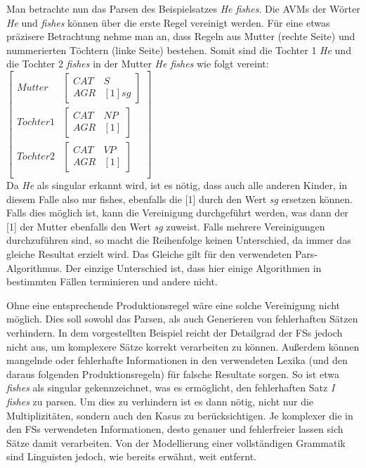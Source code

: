 \documentclass[12pt]{report}
\begin{document}
Man betrachte nun das Parsen des Beispielsatzes \textit{\glqq  He fishes\grqq{}}. Die AVMs der Wörter \textit{He} und \textit{fishes} können über die erste Regel vereinigt werden. Für eine etwas präzisere Betrachtung nehme man an, dass Regeln aus Mutter (rechte Seite) und nummerierten Töchtern (linke Seite) bestehen. Somit sind die Tochter 1 \textit{He} und die Tochter 2 \textit{fishes} in der Mutter \textit{He fishes} wie folgt vereint:\\

$\begin{bmatrix} 
Mutter & \begin{bmatrix} 
CAT & S \\
AGR & [1] sg
\end{bmatrix} \\
Tochter 1 & \begin{bmatrix} 
CAT & NP \\
AGR & [1]
\end{bmatrix} \\
Tochter 2 & \begin{bmatrix} 
CAT & VP \\
AGR & [1]
\end{bmatrix}\\
\end{bmatrix}$\\

Da \textit{\glqq  He\grqq{}} als singular erkannt wird, ist es nötig, dass auch alle anderen Kinder, in diesem Falle also nur \glqq  fishes\grqq{}, ebenfalls die [1] durch den Wert \textit{sg} ersetzen können. Falls dies möglich ist, kann die Vereinigung durchgeführt werden, was dann der [1] der Mutter ebenfalls den Wert \textit{sg} zuweist. Falls mehrere Vereinigungen durchzuführen sind, so macht die Reihenfolge keinen Unterschied, da immer das gleiche Resultat erzielt wird. Das Gleiche gilt für den verwendeten Pars-Algorithmus. Der einzige Unterschied ist, dass hier einige Algorithmen in bestimmten Fällen terminieren und andere nicht. 

Ohne eine entsprechende Produktionsregel wäre eine solche Vereinigung nicht möglich. Dies soll sowohl das Parsen, als auch Generieren von fehlerhaften Sätzen verhindern. In dem vorgestellten Beispiel reicht der Detailgrad der FSs jedoch nicht aus, um komplexere Sätze korrekt verarbeiten zu können.
Außerdem können mangelnde oder fehlerhafte Informationen in den verwendeten Lexika (und den daraus folgenden Produktionsregeln) für falsche Resultate sorgen. So ist etwa \textit{\glqq  fishes\grqq{}} als singular gekennzeichnet, was es ermöglicht, den fehlerhaften Satz \textit{\glqq  I fishes\grqq{}} zu parsen. Um dies zu verhindern ist es dann nötig, nicht nur die Multiplizitäten, sondern auch den Kasus zu berücksichtigen. Je komplexer die in den FSs verwendeten Informationen, desto genauer und fehlerfreier lassen sich Sätze damit verarbeiten. Von der Modellierung einer vollständigen Grammatik sind Linguisten jedoch, wie bereits erwähnt, weit entfernt. 
\end{document}
